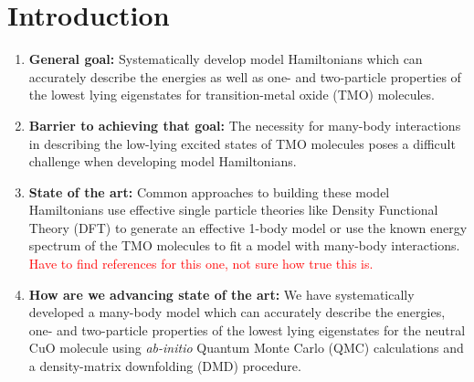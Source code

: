\documentclass{article}
\begin{document}
\section{Introduction}
\begin{enumerate}
\item \textbf{General goal: }
Systematically develop model Hamiltonians which can accurately describe the energies as well as one- and two-particle properties of the lowest lying eigenstates for transition-metal oxide (TMO) molecules.

\item \textbf{Barrier to achieving that goal: } The necessity for many-body interactions in describing the low-lying excited states of TMO molecules poses a difficult challenge when developing model Hamiltonians.

\item \textbf{State of the art: } Common approaches to building these model Hamiltonians use effective single particle theories like Density Functional Theory (DFT) to generate an effective 1-body model or use the known energy spectrum of the TMO molecules to fit a model with many-body interactions. 
\textcolor{red}{Have to find references for this one, not sure how true this is.}

\item\textbf{How are we advancing state of the art: } We have systematically developed a many-body model which can accurately describe the energies, one- and two-particle properties of the lowest lying eigenstates for the neutral CuO molecule using \textit{ab-initio} Quantum Monte Carlo (QMC) calculations and a density-matrix downfolding (DMD) procedure. 
\end{enumerate}
\end{document}
